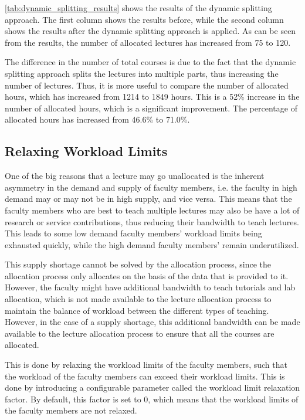 \autoref{tab:dynamic_splitting_results} shows the results of the dynamic splitting approach. The first column shows the results before, while the second column shows the results after the dynamic splitting approach is applied. As can be seen from the results, the number of allocated lectures has increased from 75 to 120.

The difference in the number of total courses is due to the fact that the dynamic splitting approach splits the lectures into multiple parts, thus increasing the number of lectures. Thus, it is more useful to compare the number of allocated hours, which has increased from 1214 to 1849 hours. This is a 52\% increase in the number of allocated hours, which is a significant improvement. The percentage of allocated hours has increased from 46.6\% to 71.0\%.


\subsection{Relaxing Workload Limits}
\label{sec:workload_limit_relaxation}

One of the big reasons that a lecture may go unallocated is the inherent asymmetry in the demand and supply of faculty members, i.e. the faculty in high demand may or may not be in high supply, and vice versa. This means that the faculty members who are best to teach multiple lectures may also be have a lot of research or service contributions, thus reducing their bandwidth to teach lectures. This leads to some low  demand faculty members' workload limits being exhausted quickly, while the high demand faculty members' remain underutilized.

This supply shortage cannot be solved by the allocation process, since the allocation process only allocates on the basis of the data that is provided to it. However, the faculty might have additional bandwidth to teach tutorials and lab allocation, which is not made available to the lecture allocation process to maintain the balance of workload between the different types of teaching. However, in the case of a supply shortage, this additional bandwidth can be made available to the lecture allocation process to ensure that all the courses are allocated.

This is done by relaxing the workload limits of the faculty members, such that the workload of the faculty members can exceed their workload limits. This is done by introducing a configurable parameter called the workload limit relaxation factor. By default, this factor is set to 0, which means that the workload limits of the faculty members are not relaxed.

